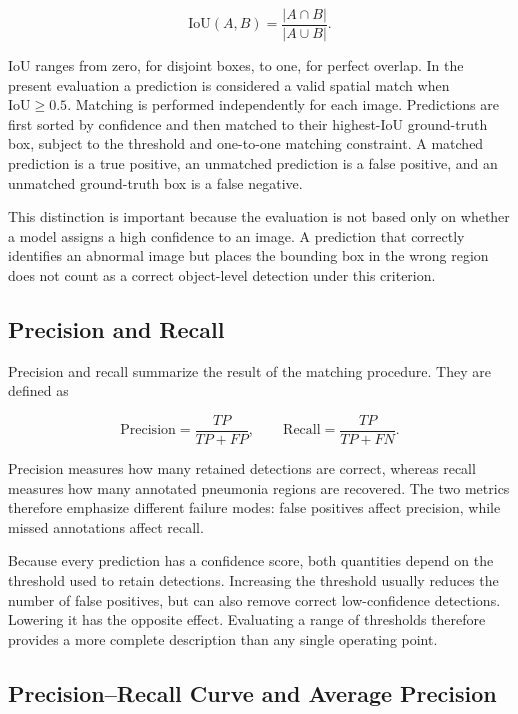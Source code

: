 \documentclass[11pt,a4paper]{article}
\begin{document}
\begin{equation}
\mathrm{IoU}(A,B)=\frac{|A\cap B|}{|A\cup B|}.
\end{equation}

IoU ranges from zero, for disjoint boxes, to one, for perfect overlap. In the
present evaluation a prediction is considered a valid spatial match when
$\mathrm{IoU}\geq0.5$. Matching is performed independently for each image.
Predictions are first sorted by confidence and then matched to their
highest-IoU ground-truth box, subject to the threshold and one-to-one matching
constraint. A matched prediction is a true positive, an unmatched prediction
is a false positive, and an unmatched ground-truth box is a false negative.

This distinction is important because the evaluation is not based only on
whether a model assigns a high confidence to an image. A prediction that
correctly identifies an abnormal image but places the bounding box in the
wrong region does not count as a correct object-level detection under this
criterion.

\subsection{Precision and Recall}
\label{subsec:precision_recall}

Precision and recall summarize the result of the matching procedure. They are
defined as

\begin{equation}
\mathrm{Precision}=\frac{TP}{TP+FP},
\qquad
\mathrm{Recall}=\frac{TP}{TP+FN}.
\end{equation}

Precision measures how many retained detections are correct, whereas recall
measures how many annotated pneumonia regions are recovered. The two metrics
therefore emphasize different failure modes: false positives affect
precision, while missed annotations affect recall.

Because every prediction has a confidence score, both quantities depend on
the threshold used to retain detections. Increasing the threshold usually
reduces the number of false positives, but can also remove correct
low-confidence detections. Lowering it has the opposite effect. Evaluating a
range of thresholds therefore provides a more complete description than any
single operating point.

\subsection{Precision--Recall Curve and Average Precision}
\label{subsec:average_precision}
\end{document}
